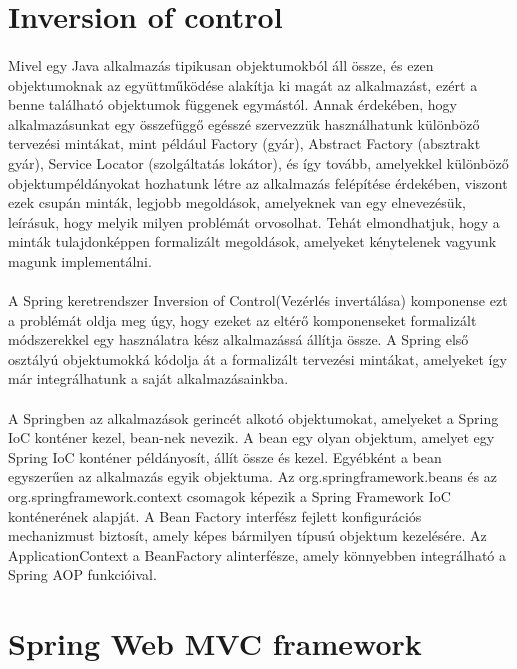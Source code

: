 \section{Inversion of control}
\paragraph{}
Mivel egy Java alkalmazás tipikusan objektumokból áll össze, és ezen objektumoknak az együttműködése alakítja ki magát az alkalmazást, ezért a benne található objektumok függenek egymástól. Annak érdekében, hogy alkalmazásunkat egy összefüggő egésszé szervezzük használhatunk különböző tervezési mintákat, mint például Factory (gyár), Abstract Factory (absztrakt gyár), Service Locator (szolgáltatás lokátor), és így tovább, amelyekkel különböző objektumpéldányokat hozhatunk létre az alkalmazás felépítése érdekében, viszont ezek csupán minták, legjobb megoldások, amelyeknek van egy elnevezésük, leírásuk, hogy melyik milyen problémát orvosolhat. Tehát elmondhatjuk, hogy a minták tulajdonképpen formalizált megoldások, amelyeket kénytelenek vagyunk magunk implementálni. 

\paragraph{}
A Spring keretrendszer Inversion of Control(Vezérlés invertálása) komponense ezt a problémát oldja meg úgy, hogy ezeket az eltérő komponenseket formalizált módszerekkel egy használatra kész alkalmazássá állítja össze. A Spring első osztályú objektumokká kódolja át a formalizált tervezési mintákat, amelyeket így már integrálhatunk a saját alkalmazásainkba. 

\paragraph{}
A Springben az alkalmazások gerincét alkotó objektumokat, amelyeket a Spring IoC konténer kezel, bean-nek nevezik. A bean egy olyan objektum, amelyet egy Spring IoC konténer példányosít, állít össze és kezel. Egyébként a bean egyszerűen az alkalmazás egyik objektuma. Az org.springframework.beans és az org.springframework.context csomagok képezik a Spring Framework IoC konténerének alapját. A Bean Factory interfész fejlett konfigurációs mechanizmust biztosít, amely képes bármilyen típusú objektum kezelésére. Az ApplicationContext a BeanFactory alinterfésze, amely könnyebben integrálható a Spring AOP funkcióival.

\section{Spring Web MVC framework}
